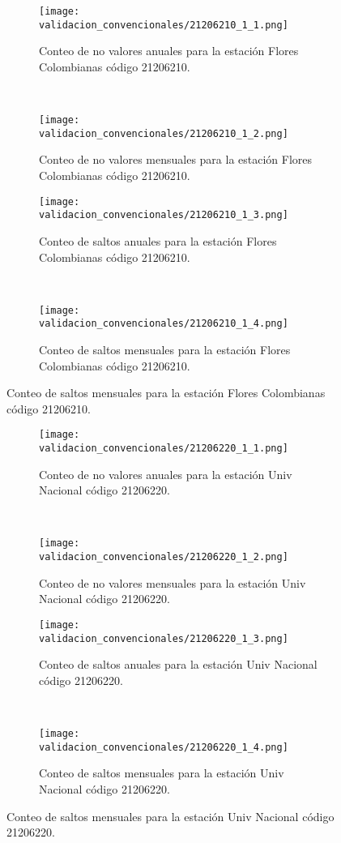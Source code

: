 \begin{figure}[H]\ContinuedFloat
\centering
	\begin{subfigure}[normla]{0.4\textwidth}
	\texttt{[image: validacion\_convencionales/21206210\_1\_1.png]}
		\caption{Conteo de no valores anuales para la estación Flores Colombianas código 21206210.}
		\label{subfig:a1}
		\end{subfigure}
		~
    \begin{subfigure}[normla]{0.4\textwidth}
	\texttt{[image: validacion\_convencionales/21206210\_1\_2.png]}
		\caption{Conteo de no valores mensuales para la estación Flores Colombianas código 21206210.}
		\label{subfig:a2}
		\end{subfigure}
		
    \begin{subfigure}[normla]{0.4\textwidth}
	\texttt{[image: validacion\_convencionales/21206210\_1\_3.png]}
		\caption{Conteo de saltos anuales para la estación Flores Colombianas código 21206210.}
		\label{subfig:a1}
		\end{subfigure}
		~
    \begin{subfigure}[normla]{0.4\textwidth}
	\texttt{[image: validacion\_convencionales/21206210\_1\_4.png]}
		\caption{Conteo de saltos mensuales para la estación Flores Colombianas código 21206210.}
		\label{subfig:a2}
		\end{subfigure}

	
\end{figure}
           
\begin{figure}[H]\ContinuedFloat
\centering
	\begin{subfigure}[normla]{0.4\textwidth}
	\texttt{[image: validacion\_convencionales/21206220\_1\_1.png]}
		\caption{Conteo de no valores anuales para la estación Univ Nacional código 21206220.}
		\label{subfig:a1}
		\end{subfigure}
		~
    \begin{subfigure}[normla]{0.4\textwidth}
	\texttt{[image: validacion\_convencionales/21206220\_1\_2.png]}
		\caption{Conteo de no valores mensuales para la estación Univ Nacional código 21206220.}
		\label{subfig:a2}
		\end{subfigure}
		
    \begin{subfigure}[normla]{0.4\textwidth}
	\texttt{[image: validacion\_convencionales/21206220\_1\_3.png]}
		\caption{Conteo de saltos anuales para la estación Univ Nacional código 21206220.}
		\label{subfig:a1}
		\end{subfigure}
		~
    \begin{subfigure}[normla]{0.4\textwidth}
	\texttt{[image: validacion\_convencionales/21206220\_1\_4.png]}
		\caption{Conteo de saltos mensuales para la estación Univ Nacional código 21206220.}
		\label{subfig:a2}
		\end{subfigure}

	
\end{figure}
           
